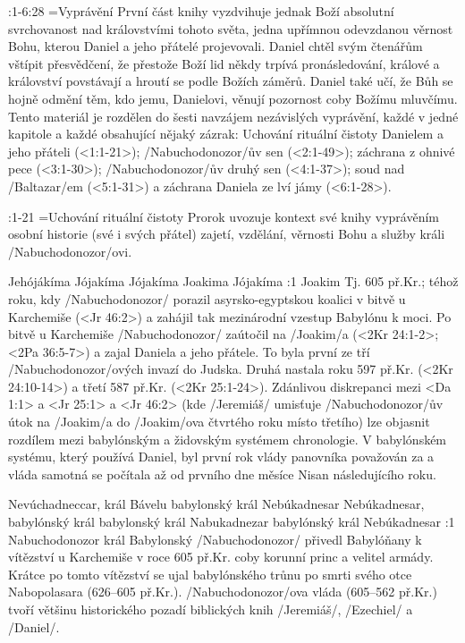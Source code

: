 
%




:1-6:28 {}={Vyprávění}  První část knihy vyzdvihuje jednak Boží absolutní svrchovanost nad královstvími tohoto světa, jedna upřímnou odevzdanou věrnost Bohu, kterou Daniel a jeho přátelé projevovali. 
Daniel chtěl svým čtenářům vštípit přesvědčení, že přestože Boží lid někdy trpívá pronásledování, králové a království povstávají a hroutí se podle Božích záměrů. Daniel také učí, že Bůh se hojně odmění těm, kdo jemu, Danielovi, věnují pozornost coby Božímu mluvčímu. Tento materiál je rozdělen do šesti navzájem nezávislých vyprávění, každé v jedné kapitole a každé obsahující nějaký zázrak:
Uchování rituální čistoty Danielem a jeho přáteli (<1:1-21>); \x/Nabuchodonozor/ův sen (<2:1-49>); záchrana z ohnivé pece (<3:1-30>); \x/Nabuchodonozor/ův druhý sen (<4:1-37>); soud nad \x/Baltazar/em (<5:1-31>) a záchrana Daniela ze lví jámy (<6:1-28>).

:1-21 {}={Uchování rituální čistoty}  Prorok uvozuje kontext své knihy vyprávěním osobní historie (své i svých přátel) zajetí, vzdělání, věrnosti Bohu a služby králi \x/Nabuchodonozor/ovi.

    {Jehójákíma} %
    {Jójakíma}  %
    {Jójakíma} %
    {Joakima}  %
    {Jójakíma}  %
:1 {Joakim}  Tj. 605 př.Kr.; téhož roku, kdy \x/Nabuchodonozor/ porazil  asyrsko-egyptskou koalici v bitvě u Karchemiše (<Jr 46:2>) a zahájil tak mezinárodní vzestup Babylónu k moci. Po bitvě u Karchemiše \x/Nabuchodonozor/ zaútočil na \x/Joakim/a (<2Kr 24:1-2>; <2Pa 36:5-7>) a zajal Daniela a jeho přátele. 
To byla první ze tří \x/Nabuchodonozor/ových  invazí do Judska. Druhá nastala roku 597 př.Kr. (<2Kr 24:10-14>) a třetí 587 př.Kr. (<2Kr 25:1-24>). Zdánlivou diskrepanci mezi <Da 1:1> a <Jr 25:1> a <Jr 46:2> (kde \x/Jeremiáš/ umisťuje \x/Nabuchodonozor/ův útok na \x/Joakim/a do \x/Joakim/ova čtvrtého roku místo třetího) lze objasnit rozdílem mezi babylónským a židovským systémem chronologie. V babylónském systému, který používá Daniel, byl první rok vlády panovníka považován za  a vláda samotná se počítala až od prvního dne měsíce Nisan následujícího roku.

    {Nevúchadneccar, král Bávelu} %
    {babylonský král Nebúkadnesar}  %
    {Nebúkadnesar, babylónský král} %
    {babylonský král Nabukadnezar}  %
    {babylónský král Nebúkadnesar}  %
:1 {Nabuchodonozor král Babylonský}  \x/Nabuchodonozor/ přivedl Babylóňany k vítězství u Karchemiše v roce 605 př.Kr. coby korunní princ a velitel armády. Krátce po tomto vítězství se ujal babylónského trůnu po smrti svého otce Nabopolasara (626--605 př.Kr.). \x/Nabuchodonozor/ova vláda (605--562 př.Kr.) tvoří většinu historického pozadí  biblických knih \x/Jeremiáš/, \x/Ezechiel/ a \x/Daniel/.     

